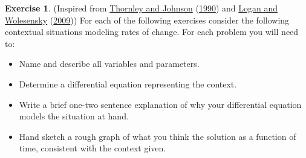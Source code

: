 \documentclass[
]{krantz}
\providecommand{\tightlist}{%
  \setlength{\itemsep}{0pt}\setlength{\parskip}{0pt}}
\theoremstyle{definition}
\theoremstyle{definition}
\theoremstyle{definition}
\newtheorem{exercise}{Exercise}[chapter]
\theoremstyle{definition}
\theoremstyle{remark}
\begin{document}
\begin{exercise}
\protect\hypertarget{exr:unnamed-chunk-8}{}{\label{exr:unnamed-chunk-8} }(Inspired from \protect\hyperlink{ref-thornley_plant_1990}{Thornley and Johnson} (\protect\hyperlink{ref-thornley_plant_1990}{1990}) and \protect\hyperlink{ref-logan_mathematical_2009}{Logan and Wolesensky} (\protect\hyperlink{ref-logan_mathematical_2009}{2009})) For each of the following exercises consider the following contextual situations modeling rates of change. For each problem you will need to:

\begin{itemize}
\tightlist
\item
  Name and describe all variables and parameters.
\item
  Determine a differential equation representing the context.
\item
  Write a brief one-two sentence explanation of why your differential equation models the situation at hand.
\item
  Hand sketch a rough graph of what you think the solution as a function of time, consistent with the context given.
\end{itemize}


\end{exercise}
\end{document}
